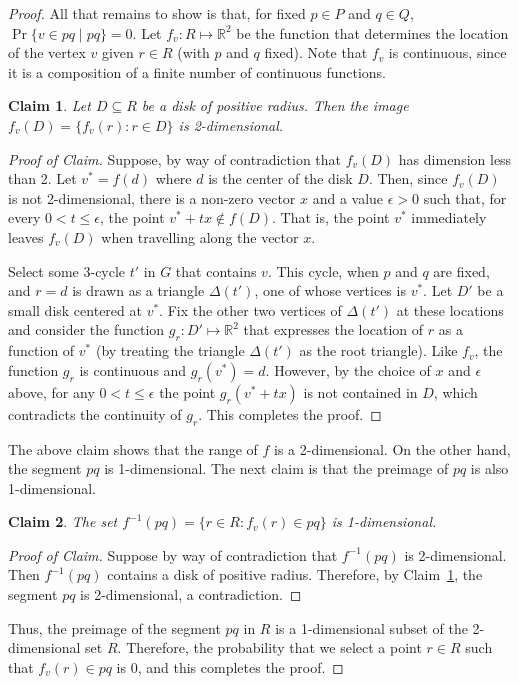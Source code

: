 \documentclass{article}
\newcommand{\R}{\mathbb{R}}
\newtheorem{clm}{Claim}
\begin{document}
\begin{proof}
All that remains to show is that, for fixed $p\in P$ and $q\in Q$,
$\Pr\{v\in pq\mid pq\} = 0$.  Let $f_v:R\mapsto \R^2$ be the function
that determines the location of the vertex $v$ given $r\in R$ (with
$p$ and $q$ fixed). Note that $f_v$ is continuous, since it is a
composition of a finite number of continuous functions.

\begin{clm}\label{clm:big-image}
Let $D\subseteq R$ be a disk of positive radius.  Then the image 
$f_v(D) = \{f_v(r):r\in D\}$ is 2-dimensional.
\end{clm}

\begin{proof}[Proof of Claim]

Suppose, by way of contradiction that $f_v(D)$ has dimension less than
2.  Let $v^* = f(d)$ where $d$ is the center of the disk $D$.  Then,
since $f_v(D)$ is not 2-dimensional, there is a non-zero vector $x$
and a value $\epsilon >0$ such that, for every $0< t \le \epsilon$,
the point $v^*+tx \not\in f(D)$. That is, the point $v^*$ immediately
leaves $f_v(D)$ when travelling along the vector $x$.

Select some 3-cycle $t'$ in $G$ that contains $v$.  This cycle, when
$p$ and $q$ are fixed, and $r=d$ is drawn as a triangle $\Delta(t')$,
one of whose vertices is $v^*$.  Let $D'$ be a small disk centered at
$v^*$.  Fix the other two vertices of $\Delta(t')$ at these locations
and consider the function $g_r:D'\mapsto\R^2$ that expresses the
location of $r$ as a function of $v^*$ (by treating the triangle
$\Delta(t')$ as the root triangle).  Like $f_v$, the function
$g_r$ is continuous and $g_r(v^*) = d$.  However, by the choice
of $x$ and $\epsilon$ above, for any $0< t \le \epsilon$ the point
$g_r(v^*+tx)$ is not contained in $D$, which contradicts the
continuity of $g_r$.  This completes the proof.
\end{proof}

The above claim shows that the range of $f$ is a 2-dimensional.  On
the other hand, the segment $pq$ is 1-dimensional.  The next claim is
that the preimage of $pq$ is also 1-dimensional.

\begin{clm}\label{clm:small-image}
The set $f^{-1}(pq) = \{ r\in R : f_v(r) \in pq\}$ is 1-dimensional.
\end{clm}

\begin{proof}[Proof of Claim]
Suppose by way of contradiction that $f^{-1}(pq)$ is
2-dimensional.  Then $f^{-1}(pq)$ contains a disk of positive radius.
Therefore, by Claim~\ref{clm:big-image}, the segment $pq$ is
2-dimensional, a contradiction.
\end{proof}

Thus, the preimage of the segment $pq$ in $R$ is a 1-dimensional
subset of the 2-dimensional set $R$.  Therefore, the probability that
we select a point $r\in R$ such that $f_v(r)\in pq$ is 0, and this
completes the proof.
\end{proof}
\end{document}
